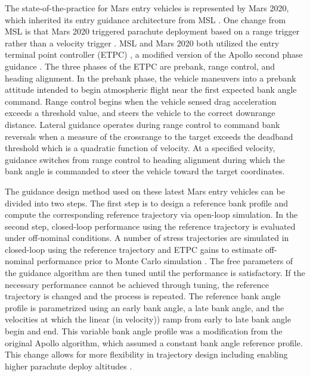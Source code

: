 \documentclass[journal ]{new-aiaa}
\begin{document}
The state-of-the-practice for Mars entry vehicles is represented by Mars 2020, which inherited its entry guidance architecture from MSL \cite{M2020_EDL}. One change from MSL is that Mars 2020 triggered parachute deployment based on a range trigger rather than a velocity trigger \cite{TriggerComparison2020}. 
MSL and Mars 2020 both utilized the entry terminal point controller (ETPC) \cite{MSL_EDL, M2020_EDL}, a modified version of the Apollo second phase guidance \cite{MSL_EDL2}.
The three phases of the ETPC are prebank, range control, and heading alignment. In the prebank phase, the vehicle maneuvers into a prebank attitude intended to begin atmospheric flight near the first expected bank angle command.
Range control begins when the vehicle sensed drag acceleration exceeds a threshold value, and steers the vehicle to the correct downrange distance. Lateral guidance operates during range control to command bank reversals when a measure of the crossrange to the target exceeds the deadband threshold which is a quadratic function of velocity. At a specified velocity, guidance switches from range control to heading alignment during which the bank angle is commanded to steer the vehicle toward the target coordinates.


The guidance design method used on these latest Mars entry vehicles \cite{MSL_EDL2,M2020_EDL} can be divided into two steps. The first step is to design a reference bank profile and compute the corresponding reference trajectory via open-loop simulation. In the second step, closed-loop performance using the reference trajectory is evaluated under off-nominal conditions. A number of stress trajectories are simulated in closed-loop using the reference trajectory and ETPC gains to estimate off-nominal performance prior to Monte Carlo simulation \cite{MSL_EDL2}. The free parameters of the guidance algorithm are then tuned until the performance is satisfactory. If the necessary performance cannot be achieved through tuning, the reference trajectory is changed and the process is repeated. 
The reference bank angle profile is parametrized using an early bank angle, a late bank angle, and the velocities at which the linear (in velocity)) ramp from early to late bank angle begin and end. This variable bank angle profile was a modification from the original Apollo algorithm, which assumed a constant bank angle reference profile. This change allows for more flexibility in trajectory design including enabling higher parachute deploy altitudes \cite{MSL_EDL2}.
\end{document}
